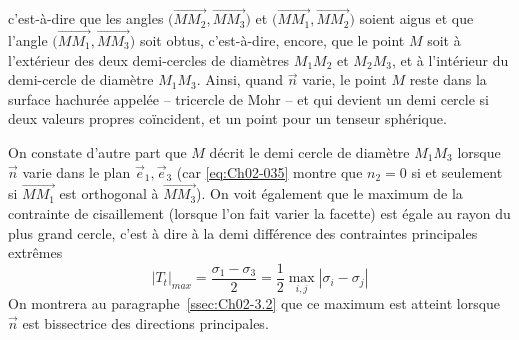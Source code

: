 c'est-à-dire que les angles $\bigl( \vec{MM_2},\vec{MM_3} \bigr)$ et  $\bigl( \vec{MM_1},\vec{MM_2} \bigr)$ soient aigus et que l'angle $\bigl( \vec{MM_1}, \vec{MM_3} \bigr)$ soit obtus, c'est-à-dire, encore, que le point $M$ soit à l'extérieur des deux demi-cercles de diamètres $M_1M_2$ et $M_2M_3$, et à l'intérieur du demi-cercle de diamètre $M_1M_3$.
Ainsi, quand $\vec{n}$ varie, le point $M$ reste dans la surface hachurée appelée -- tricercle de Mohr -- et qui devient un demi cercle si deux valeurs propres coïncident, et un point pour un tenseur sphérique.

On constate d'autre part que $M$ décrit le demi cercle de diamètre $M_1M_3$ lorsque $\vec{n}$ varie dans le plan $\vec{e}_1, \vec{e}_3$ (car \eqref{eq:Ch02-035} montre que $n_2 = 0$  si et seulement si $\vec{MM_1}$ est orthogonal à $\vec{MM_3}$).
On voit également que le maximum de la contrainte de cisaillement (lorsque l'on fait varier la facette) est égale au rayon du plus grand cercle, c'est à dire à la demi différence des contraintes principales extrêmes
\begin{equation}
    |T_t|_{max} = \frac{\sigma_1 - \sigma_3}{2} = \frac{1}{2} \max_{i,j} |\sigma_i - \sigma_j|
    \label{eq:Ch02-039}
\end{equation}
On montrera au paragraphe~\ref{ssec:Ch02-3.2} que ce maximum est atteint lorsque $\vec{n}$ est bissectrice des directions principales.  

